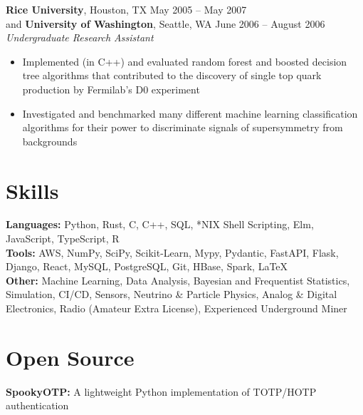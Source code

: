 \documentclass[margin,line]{resume}
\begin{document}
\begin{resume}
    \textbf{Rice University}, Houston, TX \hfill May 2005 -- May 2007 \vspace{1mm}\\\vspace{1mm}%
    and \textbf{University of Washington}, Seattle, WA \hfill June 2006 -- August 2006 \vspace{1mm}\\\vspace{1mm}%
    \textsl{Undergraduate Research Assistant}
    \begin{itemize}
    \item Implemented (in C++) and evaluated random forest and boosted decision tree algorithms that contributed to the discovery of single top quark production by Fermilab's D0 experiment
    \item Investigated and benchmarked many different machine learning classification algorithms for their power to discriminate signals of supersymmetry from backgrounds
    \end{itemize}

    \section{\mysidestyle Skills}\vspace{0mm}%
    \textbf{Languages:} Python, Rust, C, C++, SQL, *NIX Shell Scripting, Elm, JavaScript, TypeScript, R
    \vspace{1mm}\\\vspace{0mm}%
    \textbf{Tools:} AWS, NumPy, SciPy, Scikit-Learn, Mypy, Pydantic, FastAPI, Flask, Django, React, MySQL, PostgreSQL, Git, HBase, Spark, \LaTeX
    \vspace{1mm}\\\vspace{0mm}%
    \textbf{Other:} Machine Learning, Data Analysis, Bayesian and Frequentist Statistics, Simulation, CI/CD, Sensors, Neutrino \& Particle Physics, Analog \& Digital Electronics, Radio (Amateur Extra License), Experienced Underground Miner

    \section{\mysidestyle Open Source}\vspace{0mm}%
    \textbf{SpookyOTP:} A lightweight Python implementation of TOTP/HOTP authentication
    \vspace{1mm}%


\end{resume}
\end{document}
